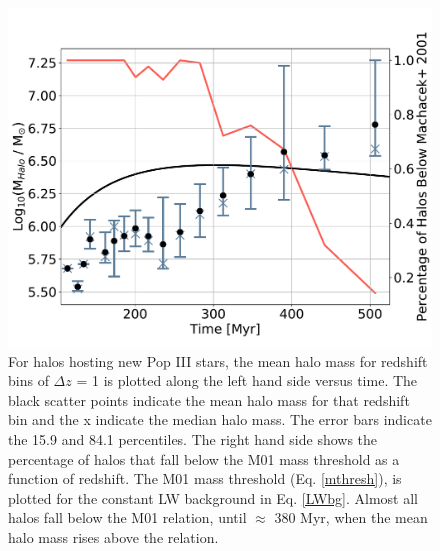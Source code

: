 \documentclass[a4paper,fleqn,usenatbib]{mnras}
\begin{document}
\begin{figure}
	\includegraphics[width=\columnwidth]{images/mean_mass_errorb_fix.pdf}
    \caption{For halos hosting new Pop III stars, the mean halo mass for redshift bins of $\Delta z$ = 1 is plotted along the left hand side versus time. The black scatter points indicate the mean halo mass for that redshift bin and the x indicate the median halo mass. The error bars indicate the 15.9 and 84.1 percentiles. The right hand side shows the percentage of halos that fall below the M01 mass threshold as a function of redshift. The M01 mass threshold (Eq. \ref{mthresh}), is plotted for the constant LW background in Eq. \ref{LWbg}. Almost all halos fall below the M01 relation, until $\approx$ 380 Myr, when the mean halo mass rises above the relation.}
    \label{fig:mean_mass}
\end{figure}
\end{document}
